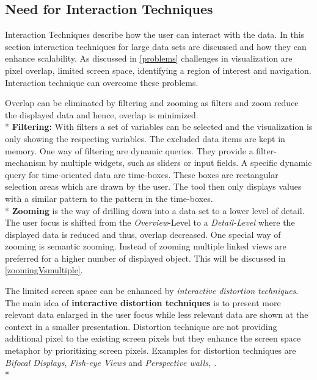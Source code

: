 \subsection{Need for Interaction Techniques}
Interaction Techniques describe how the user can interact with the data. In this section interaction techniques for large data sets are discussed and how they can enhance scalability. As discussed in \ref{problems} challenges in visualization are pixel overlap, limited screen space, identifying a region of interest and navigation. Interaction technique can overcome these problems. 
\par
Overlap can be eliminated by filtering and zooming as filters and zoom reduce the displayed data and hence, overlap is minimized. \\*
\textbf{Filtering:} With filters a set of variables can be selected and the visualization is only showing the respecting variables. The excluded data items are kept in memory.
One way of filtering are dynamic queries. They provide a filter-mechanism by multiple widgets, such as sliders or input fields\cite{Hochheiser2004,Shneiderman2008,Aigner2011}. A specific dynamic query for time-oriented data are time-boxes. These boxes are rectangular selection areas which are drawn by the user. The tool then only displays values with a similar pattern to the pattern in the time-boxes.\\*
\textbf{Zooming} is the way of drilling down into a data set to a lower level of detail. The user focus is shifted from the \textit{Overview}-Level to a \textit{Detail-Level} where the displayed data is reduced and thus, overlap decreased. One special way of zooming is semantic zooming\cite{boulos2003use}. Instead of zooming multiple linked views are preferred for a higher number of displayed object. This will be discussed in \ref{zoomingVsmultiple}. 
\par

The limited screen space can be enhanced by \textit{interactive distortion techniques}\cite{mackinlay1991perspective}.
The main idea of \textbf{interactive distortion techniques} is to present more relevant data enlarged in the user focus while less relevant data are shown at the context in a smaller presentation. Distortion technique are not  providing additional pixel to the existing screen pixels but they enhance the screen space metaphor by prioritizing screen pixels.
Examples for distortion techniques are \textit{Bifocal Displays}\cite{Spence1982}, \textit{Fish-eye Views} and \textit{Perspective walls\cite{Keim2005}, \cite{mackinlay1991perspective}}.\\*

